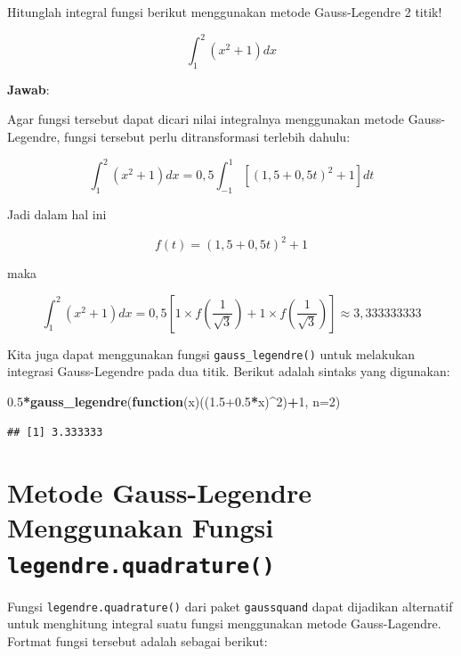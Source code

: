 \documentclass[]{book}
\newenvironment{Shaded}{\begin{snugshade}}{\end{snugshade}}
\newcommand{\ControlFlowTok}[1]{\textcolor[rgb]{0.13,0.29,0.53}{\textbf{#1}}}
\newcommand{\DataTypeTok}[1]{\textcolor[rgb]{0.13,0.29,0.53}{#1}}
\newcommand{\DecValTok}[1]{\textcolor[rgb]{0.00,0.00,0.81}{#1}}
\newcommand{\FloatTok}[1]{\textcolor[rgb]{0.00,0.00,0.81}{#1}}
\newcommand{\KeywordTok}[1]{\textcolor[rgb]{0.13,0.29,0.53}{\textbf{#1}}}
\newcommand{\NormalTok}[1]{#1}
\newcommand{\OperatorTok}[1]{\textcolor[rgb]{0.81,0.36,0.00}{\textbf{#1}}}
\theoremstyle{definition}
\theoremstyle{definition}
\theoremstyle{definition}
\theoremstyle{remark}
\let\BeginKnitrBlock\begin \let\EndKnitrBlock\end
\begin{document}
\BeginKnitrBlock{example}
\protect\hypertarget{exm:gausslanexm}{}{\label{exm:gausslanexm} }Hitunglah integral fungsi berikut menggunakan metode Gauss-Legendre 2 titik!
\EndKnitrBlock{example}

\[
\int_1^2 \left(x^2+1\right)dx
\]

\textbf{Jawab}:

Agar fungsi tersebut dapat dicari nilai integralnya menggunakan metode Gauss-Legendre, fungsi tersebut perlu ditransformasi terlebih dahulu:

\[
\int_1^2 \left(x^2+1\right)dx=0,5\int_{-1}^1 \left[\left(1,5+0,5t\right)^2+1\right]dt
\]

Jadi dalam hal ini

\[
f\left(t\right)=\left(1,5+0,5t\right)^2+1
\]

maka

\[
\int_1^2 \left(x^2+1\right)dx=0,5\left[1\times f\left(\frac{1}{\sqrt{3}}\right)+1\times f\left(\frac{1}{\sqrt{3}}\right)\right]\approx 3,333333333
\]

Kita juga dapat menggunakan fungsi \texttt{gauss\_legendre()} untuk melakukan integrasi Gauss-Legendre pada dua titik. Berikut adalah sintaks yang digunakan:

\begin{Shaded}
\begin{Highlighting}[]
\FloatTok{0.5}\OperatorTok{*}\KeywordTok{gauss_legendre}\NormalTok{(}\ControlFlowTok{function}\NormalTok{(x)((}\FloatTok{1.5+0.5}\OperatorTok{*}\NormalTok{x)}\OperatorTok{^}\DecValTok{2}\NormalTok{)}\OperatorTok{+}\DecValTok{1}\NormalTok{,}
               \DataTypeTok{n=}\DecValTok{2}\NormalTok{)}
\end{Highlighting}
\end{Shaded}

\begin{verbatim}
## [1] 3.333333
\end{verbatim}

\hypertarget{othergauss}{%
\section{\texorpdfstring{Metode Gauss-Legendre Menggunakan Fungsi \texttt{legendre.quadrature()}}{Metode Gauss-Legendre Menggunakan Fungsi legendre.quadrature()}}\label{othergauss}}

Fungsi \texttt{legendre.quadrature()} dari paket \texttt{gaussquand} dapat dijadikan alternatif untuk menghitung integral suatu fungsi menggunakan metode Gauss-Lagendre. Fortmat fungsi tersebut adalah sebagai berikut:
\end{document}
